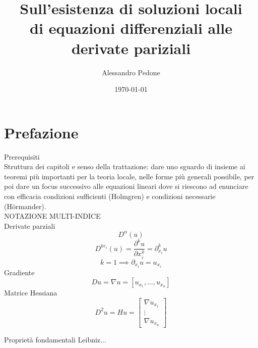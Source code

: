 \documentclass[12pt]{report}
\author{Alessandro Pedone}
\title{Sull'esistenza di soluzioni locali\\ di equazioni differenziali alle derivate pariziali}
\date{\today}
\begin{document}
\maketitle

\chapter*{Prefazione}
Prerequisiti\\
Struttura dei capitoli e senso della trattazione: dare uno sguardo di insieme ai teoremi più importanti per la teoria locale, nelle forme più generali possibile, per poi dare un focus successivo alle equazioni lineari dove si riescono ad enunciare con efficacia condizioni sufficienti (Holmgren) e condizioni necessarie (Hörmander).\\
NOTAZIONE MULTI-INDICE\\
Derivate parziali
$$D^\alpha(u)$$
$$D^{ke_i}(u)=\frac{\partial ^ku}{\partial x_i^k}=\partial ^k_{x_i}u$$
$$k=1 \implies \partial _{x_i}u=u_{x_i}$$
Gradiente
$$Du=\nabla u=\left[u_{x_1},\ldots,u_{x_n}\right]$$
Matrice Hessiana
$$D^2u=Hu=\left[
\begin{matrix}
\nabla u_{x_1}\\
\vdots\\
\nabla u_{x_n}
\end{matrix}
\right]$$

Proprietà fondamentali
Leibniz...

\tableofcontents




\appendix





\end{document}
